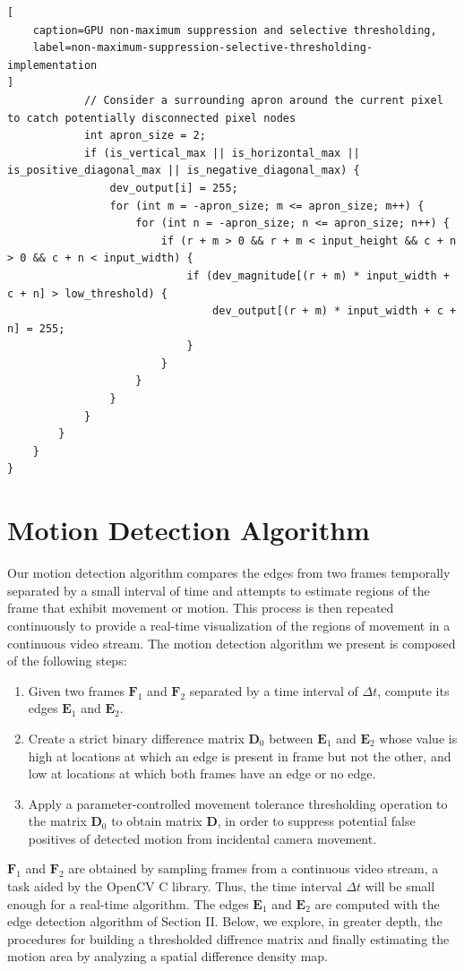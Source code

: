 \documentclass[journal]{IEEEtran}
\begin{document}
\begin{lstlisting}[
	caption=GPU non-maximum suppression and selective thresholding,
	label=non-maximum-suppression-selective-thresholding-implementation
]
			// Consider a surrounding apron around the current pixel to catch potentially disconnected pixel nodes
			int apron_size = 2;
			if (is_vertical_max || is_horizontal_max || is_positive_diagonal_max || is_negative_diagonal_max) {
				dev_output[i] = 255;
				for (int m = -apron_size; m <= apron_size; m++) {
					for (int n = -apron_size; n <= apron_size; n++) {
						if (r + m > 0 && r + m < input_height && c + n > 0 && c + n < input_width) {
							if (dev_magnitude[(r + m) * input_width + c + n] > low_threshold) {
								dev_output[(r + m) * input_width + c + n] = 255;
							}
						}
					}
				}
			}
		}
    }
}
\end{lstlisting}


\section{Motion Detection Algorithm}
Our motion detection algorithm compares the edges from two frames temporally separated by a small interval of time and attempts to estimate regions of the frame that exhibit movement or motion. This process is then repeated continuously to provide a real-time visualization of the regions of movement in a continuous video stream. The motion detection algorithm we present is composed of the following steps:
\begin{enumerate}
	\item Given two frames $\boldsymbol{F}_1$ and $\boldsymbol{F}_2$ separated by a time interval of $\Delta t$, compute its edges $\boldsymbol{E}_1$ and $\boldsymbol{E}_2$.
	\item Create a strict binary difference matrix $\boldsymbol{D}_0$ between $\boldsymbol{E}_1$ and $\boldsymbol{E}_2$ whose value is high at locations at which an edge is present in frame but not the other, and low at locations at which both frames have an edge or no edge.
	\item Apply a parameter-controlled movement tolerance thresholding operation to the matrix $\boldsymbol{D}_0$ to obtain matrix $\boldsymbol{D}$, in order to suppress potential false positives of detected motion from incidental camera movement.
\end{enumerate}
\par $\boldsymbol{F}_1$ and $\boldsymbol{F}_2$ are obtained by sampling frames from a continuous video stream, a task aided by the OpenCV C library. Thus, the time interval $\Delta t$ will be small enough for a real-time algorithm. The edges $\boldsymbol{E}_1$ and $\boldsymbol{E}_2$ are computed with the edge detection algorithm of Section II. Below, we explore, in greater depth, the procedures for building a thresholded diffrence matrix and finally estimating the motion area by analyzing a spatial difference density map.
\end{document}
